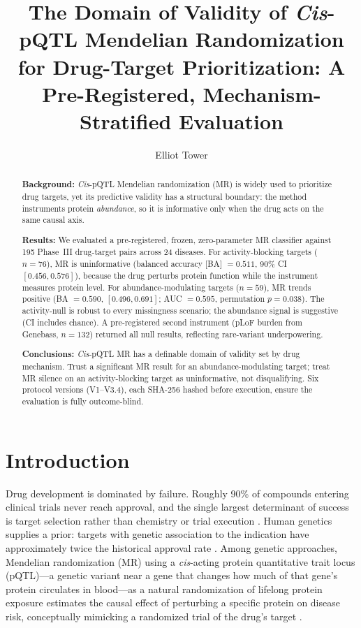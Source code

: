 \documentclass[11pt]{article}
\title{The Domain of Validity of \emph{Cis}-pQTL Mendelian Randomization for Drug-Target Prioritization: A Pre-Registered, Mechanism-Stratified Evaluation}
\author{Elliot Tower}
\affil{Independent researcher \\ \texttt{elliot@elliottower.ai}}
\begin{document}
\maketitle

\begin{abstract}
\textbf{Background:}
\emph{Cis}-pQTL Mendelian randomization (MR) is widely used to prioritize drug targets, yet its predictive validity has a structural boundary: the method instruments protein \emph{abundance}, so it is informative only when the drug acts on the same causal axis.

\textbf{Results:}
We evaluated a pre-registered, frozen, zero-parameter MR classifier against 195 Phase~III drug-target pairs across 24 diseases. For activity-blocking targets ($n = 76$), MR is uninformative (balanced accuracy [BA] $= 0.511$, 90\% CI $[0.456, 0.576]$), because the drug perturbs protein function while the instrument measures protein level. For abundance-modulating targets ($n = 59$), MR trends positive (BA $= 0.590$, $[0.496, 0.691]$; AUC $= 0.595$, permutation $p = 0.038$). The activity-null is robust to every missingness scenario; the abundance signal is suggestive (CI includes chance). A pre-registered second instrument (pLoF burden from Genebass, $n = 132$) returned all null results, reflecting rare-variant underpowering.

\textbf{Conclusions:}
\emph{Cis}-pQTL MR has a definable domain of validity set by drug mechanism. Trust a significant MR result for an abundance-modulating target; treat MR silence on an activity-blocking target as uninformative, not disqualifying. Six protocol versions (V1--V3.4), each SHA-256 hashed before execution, ensure the evaluation is fully outcome-blind.
\end{abstract}

\section{Introduction}
\label{sec:intro}

Drug development is dominated by failure. Roughly 90\% of compounds entering clinical trials never reach approval, and the single largest determinant of success is target selection rather than chemistry or trial execution \cite{nelson2015support, king2019greater}. Human genetics supplies a prior: targets with genetic association to the indication have approximately twice the historical approval rate \cite{nelson2015support, king2019greater, minikel2024refining}. Among genetic approaches, Mendelian randomization (MR) using a \emph{cis}-acting protein quantitative trait locus (pQTL)---a genetic variant near a gene that changes how much of that gene's protein circulates in blood---as a natural randomization of lifelong protein exposure estimates the causal effect of perturbing a specific protein on disease risk, conceptually mimicking a randomized trial of the drug's target \cite{gill2021mendelian}.
\end{document}
